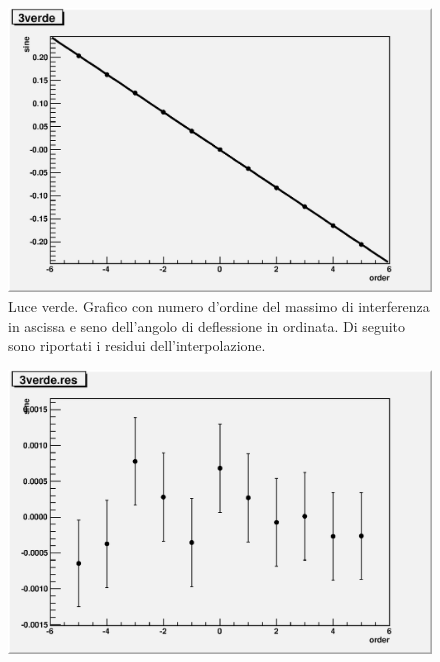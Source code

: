 \documentclass[italian,a4paper]{article}
\begin{document}
\begin{figure}[!h]\centering
\includegraphics[width=\textwidth]{3verde.eps}
\caption{Luce verde. Grafico con numero d'ordine del massimo di interferenza in ascissa e seno dell'angolo di deflessione in ordinata. Di seguito sono riportati i residui dell'interpolazione.}\label{verde}
\end{figure}
\begin{figure}[!h]\centering
\includegraphics[width=\textwidth]{3verde.res.eps}
\end{figure}
\end{document}
